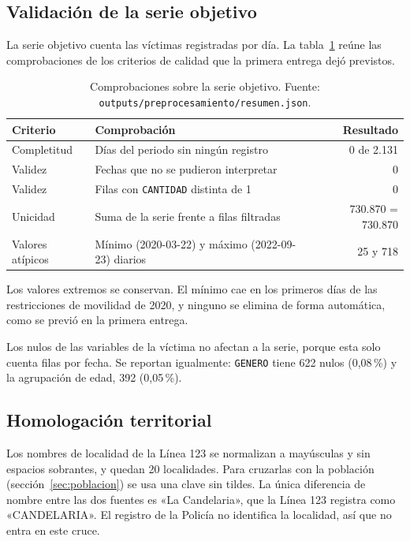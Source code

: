 \subsection{Validación de la serie objetivo}

La serie objetivo cuenta las víctimas registradas por día. La tabla~\ref{tab:validacion} reúne las comprobaciones de los criterios de calidad que la primera entrega dejó previstos.

\begin{table}[H]
\centering
\caption{Comprobaciones sobre la serie objetivo. Fuente: \texttt{outputs/\allowbreak{}preprocesamiento/\allowbreak{}resumen.json}.}\label{tab:validacion}
\small
\begin{tabular}{@{}p{3.2cm}p{7.6cm}r@{}}
\toprule
\textbf{Criterio} & \textbf{Comprobación} & \textbf{Resultado} \\
\midrule
Completitud & Días del periodo sin ningún registro & 0 de 2.131 \\
Validez & Fechas que no se pudieron interpretar & 0 \\
Validez & Filas con \texttt{CANTIDAD} distinta de 1 & 0 \\
Unicidad & Suma de la serie frente a filas filtradas & 730.870 = 730.870 \\
Valores atípicos & Mínimo (2020-03-22) y máximo (2022-09-23) diarios & 25 y 718 \\
\bottomrule
\end{tabular}
\end{table}

Los valores extremos se conservan. El mínimo cae en los primeros días de las restricciones de movilidad de 2020, y ninguno se elimina de forma automática, como se previó en la primera entrega.

Los nulos de las variables de la víctima no afectan a la serie, porque esta solo cuenta filas por fecha. Se reportan igualmente: \texttt{GENERO} tiene 622 nulos (0,08\,\%) y la agrupación de edad, 392 (0,05\,\%).

\subsection{Homologación territorial}

Los nombres de localidad de la Línea 123 se normalizan a mayúsculas y sin espacios sobrantes, y quedan 20 localidades. Para cruzarlas con la población (sección~\ref{sec:poblacion}) se usa una clave sin tildes. La única diferencia de nombre entre las dos fuentes es «La Candelaria», que la Línea 123 registra como «CANDELARIA». El registro de la Policía no identifica la localidad, así que no entra en este cruce.

